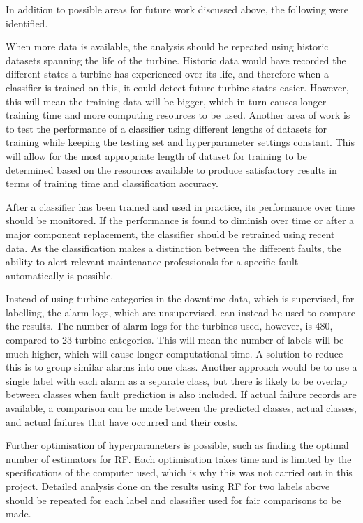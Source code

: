 In addition to possible areas for future work discussed above, the following were identified.

When more data is available, the analysis should be repeated using historic datasets spanning the life of the turbine. Historic data would have recorded the different states a turbine has experienced over its life, and therefore when a classifier is trained on this, it could detect future turbine states easier. However, this will mean the training data will be bigger, which in turn causes longer training time and more computing resources to be used. Another area of work is to test the performance of a classifier using different lengths of datasets for training while keeping the testing set and hyperparameter settings constant. This will allow for the most appropriate length of dataset for training to be determined based on the resources available to produce satisfactory results in terms of training time and classification accuracy.

After a classifier has been trained and used in practice, its performance over time should be monitored. If the performance is found to diminish over time or after a major component replacement, the classifier should be retrained using recent data. As the classification makes a distinction between the different faults, the ability to alert relevant maintenance professionals for a specific fault automatically is possible.

Instead of using turbine categories in the downtime data, which is supervised, for labelling, the alarm logs, which are unsupervised, can instead be used to compare the results. The number of alarm logs for the turbines used, however, is 480, compared to 23 turbine categories. This will mean the number of labels will be much higher, which will cause longer computational time. A solution to reduce this is to group similar alarms into one class. Another approach would be to use a single label with each alarm as a separate class, but there is likely to be overlap between classes when fault prediction is also included. If actual failure records are available, a comparison can be made between the predicted classes, actual classes, and actual failures that have occurred and their costs.

Further optimisation of hyperparameters is possible, such as finding the optimal number of estimators for RF. Each optimisation takes time and is limited by the specifications of the computer used, which is why this was not carried out in this project. Detailed analysis done on the results using RF for two labels above should be repeated for each label and classifier used for fair comparisons to be made.

